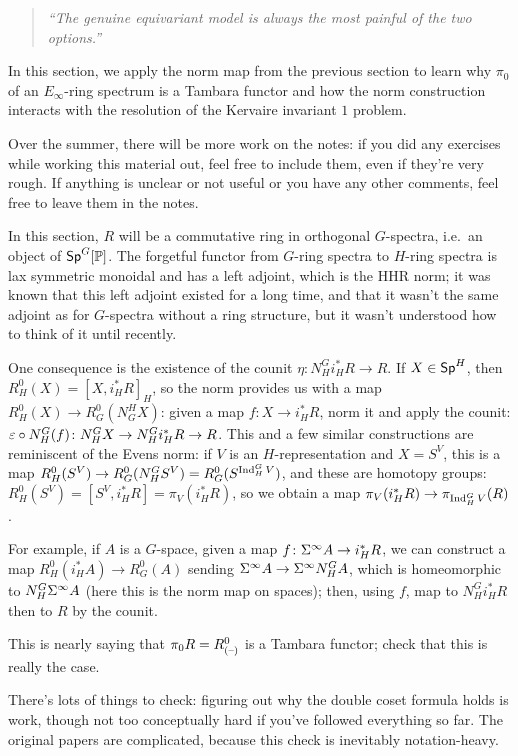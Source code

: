 \begin{quote}\textit{
	``The genuine equivariant model is always the most painful of the two options.''
}\end{quote}
In this section, we apply the norm map from the previous section to learn why $\pi_0$ of an
$E_\infty$-ring spectrum is a Tambara functor and how the norm construction interacts with the resolution of the Kervaire invariant $1$ problem.

Over the summer, there will be more work on the notes: if you did any exercises while working this material out,
feel free to include them, even if they're very rough. If anything is unclear or not useful or you have any other
comments, feel free to leave them in the notes.

In this section, $R$ will be a commutative ring in orthogonal $G$-spectra, i.e.\ an object of $\mathsf{Sp}^G[\mathbb P]$. The
forgetful functor from $G$-ring spectra to $H$-ring spectra is lax symmetric monoidal and has a left adjoint, which
is the HHR norm; it was known that this left adjoint existed for a long time, and that it wasn't the same adjoint
as for $G$-spectra without a ring structure, but it wasn't understood how to think of it until recently.

One consequence is the existence of the counit $\eta\colon N_H^Gi_H^*R\to R$. If $X\in\mathsf{Sp}^H$, then $R_H^0(X) = [X,
i_H^*R]_H$, so the norm provides us with a map $R_H^0(X)\to R_G^0(N_G^HX)$: given a map $f\colon X\to i_H^*R$,
norm it and apply the counit: $\varepsilon\circ N_H^G(f)\colon N_H^GX\to N_H^G i_H^*R\to R$. This and a few similar
constructions are reminiscent of the Evens norm: if $V$ is an $H$-representation and $X = S^V$, this is a map
$R_H^0(S^V)\to R_G^0(N_H^GS^V) = R_G^0(S^{\operatorname{Ind}_H^GV})$, and these are homotopy groups: $R_H^0(S^V) = [S^V, i_H^*R]
= \pi_V(i_H^*R)$, so we obtain a map $\pi_V(i_H^*R)\to\pi_{\operatorname{Ind}_H^GV}(R)$.

For example, if $A$ is a $G$-space, given a map $f\colon\Sigma^\infty A\to i_H^*R$, we can construct a map $R_H^0(i_H^*A)\to
R_G^0(A)$ sending $\Sigma^\infty A\to\Sigma^\infty N_H^G A$, which is homeomorphic to $N_H^G\Sigma^\infty A$ (here this is the norm map on
spaces); then, using $f$, map to $N_H^Gi_H^*R$ then to $R$ by the counit.
\begin{ex}
This is nearly saying that $\pi_0R = R_{(\text{--})}^0$ is a Tambara functor; check that this is really the case.
\end{ex}
There's lots of things to check: figuring out why the double coset formula holds is work, though not too
conceptually hard if you've followed everything so far. The original papers are complicated, because this check is
inevitably notation-heavy.

